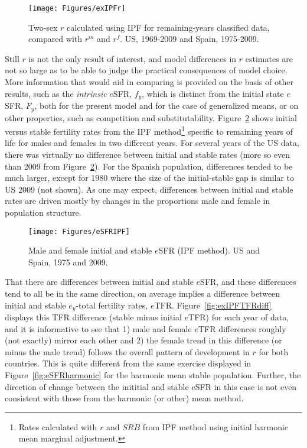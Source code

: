  \begin{figure}[ht!]
        \centering  
          \caption{Two-sex $r$ calculated using IPF for remaining-years
          classified data, compared with $r^m$ and $r^f$. US, 1969-2009 and
          Spain, 1975-2009.}
           \texttt{[image: Figures/exIPFr]}
          \label{fig:exIPFr}
\end{figure}

Still $r$ is not the only result of interest, and model differences in $r$
estimates are not so large as to be able to judge the practical consequences of
model choice. More information that would aid in comparing is provided on the
basis of other results, such as the \textit{intrinsic} $e$SFR, $f_y$, which is
distinct from the initial state $e$SFR, $F_y$, both for the present model and
for the case of generalized means, or on other properties, such as competition
and substitutability. Figure~\ref{fig:eSFRIPF} shows initial versus stable
fertility rates from the IPF method\footnote{Rates calculated with $r$
and $SRB$ from IPF method using initial harmonic mean marginal adjustment.}
specific to remaining years of life for males and females in two different years. 
For several years of the US data, there was virtually no difference between initial 
and stable rates (more so even than 2009 from Figure~\ref{fig:eSFRIPF}). For
the Spanish population, differences tended to be much larger, except for 1980
where the size of the initial-stable gap is similar to US 2009 (not shown). As
one may expect, differences between initial and stable rates are driven mostly 
by changes in the proportions male and female in population structure. 

\begin{figure}[ht!]
        \centering  
          \caption{Male and female initial and stable $e$SFR (IPF method). US
          and Spain, 1975 and 2009.}
           \texttt{[image: Figures/eSFRIPF]}
          \label{fig:eSFRIPF}
\end{figure}

That there are differences between initial and stable $e$SFR, and these
differences tend to all be in the same direction, on average implies a
difference between initial and stable $e_y$-total fertility rates, $e$TFR. Figure~\ref{fig:exIPFTFRdiff} displays this TFR difference (stable minus
initial $e$TFR) for each year of data, and it is informative to see that 1)
male and female $e$TFR differences roughly (not exactly) mirror each other and
2) the female trend in this difference (or minus the male trend) follows the
overall pattern of development in $r$ for both countries. This is quite
different from the same exercise displayed in Figure~\ref{fig:eSFRharmonic} for
the harmonic mean stable population. Further, the direction of change between
the inititial and stable $e$SFR in this case is not even consistent with those
from the harmonic (or other) mean method.

